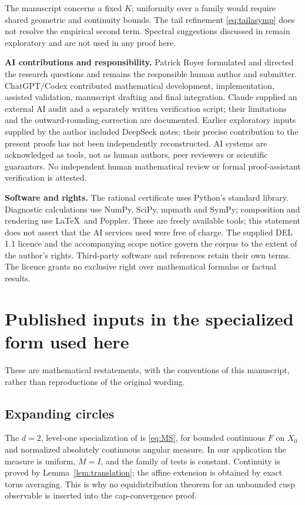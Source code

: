 \documentclass[11pt,a4paper]{article}
\theoremstyle{remark}\newtheorem{remark}{Remark}
\numberwithin{equation}{section}
\begin{document}
The manuscript concerns a fixed $K$; uniformity over a family would require shared geometric and continuity bounds. The tail refinement \eqref{eq:tailasymp} does not resolve the empirical second term. Spectral suggestions discussed in \cite{CA} remain exploratory and are not used in any proof here.

\textbf{AI contributions and responsibility.} Patrick Royer formulated and directed the research questions and remains the responsible human author and submitter. ChatGPT/Codex contributed mathematical development, implementation, assisted validation, manuscript drafting and final integration. Claude supplied an external AI audit and a separately written verification script; their limitations and the outward-rounding correction are documented. Earlier exploratory inputs supplied by the author included DeepSeek notes; their precise contribution to the present proofs has not been independently reconstructed. AI systems are acknowledged as tools, not as human authors, peer reviewers or scientific guarantors. No independent human mathematical review or formal proof-assistant verification is attested.

\textbf{Software and rights.} The rational certificate uses Python's standard library. Diagnostic calculations use NumPy, SciPy, mpmath and SymPy; composition and rendering use \LaTeX\ and Poppler. These are freely available tools; this statement does not assert that the AI services used were free of charge. The supplied DEL 1.1 licence and the accompanying scope notice govern the corpus to the extent of the author's rights. Third-party software and references retain their own terms. The licence grants no exclusive right over mathematical formulas or factual results.

\appendix
\section{Published inputs in the specialized form used here}
These are mathematical restatements, with the conventions of this manuscript, rather than reproductions of the original wording.

\subsection{Expanding circles}
The $d=2$, level-one specialization of \cite[Corollary~5.9]{MS} is \eqref{eq:MS}, for bounded continuous $F$ on $X_0$ and normalized absolutely continuous angular measure. In our application the measure is uniform, $M=I$, and the family of tests is constant. Continuity is proved by Lemma~\ref{lem:translation}; the affine extension is obtained by exact torus averaging. This is why no equidistribution theorem for an unbounded cusp observable is inserted into the cap-convergence proof.
\end{document}
